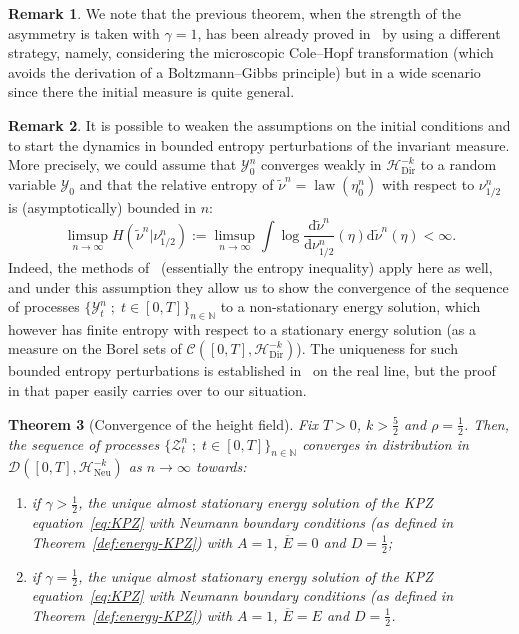 \documentclass[10pt]{amsart}
\newtheorem{theo}{Theorem}[section]
\theoremstyle{definition}\newtheorem{defi}[theo]{Definition}\newtheorem{rema}[theo]{Remark}\newtheorem{exam}[theo]{Example}\newtheorem{exem}[theo]{Example}\newtheorem{nota}[theo]{Notation}
\DeclareMathOperator{\law}{law}
\newcommand{\bb}[1]{{\mathbb #1}}
\newcommand{\mc}[1]{{\mathcal #1}}
\renewcommand{\mc}[1]{{\mathcal #1}}
\renewcommand{\bar}{\overline}
\renewcommand{\tilde}{\widetilde}
\newcommand*{\dd}{\mathrm{d}}
\begin{document}
\begin{rema}
We note that the previous theorem, when the strength of the asymmetry is taken with $\gamma =1$, has been already proved in~\cite{GLM} by using a different strategy, namely, considering the microscopic Cole--Hopf transformation (which avoids the derivation of a Boltzmann--Gibbs principle) but in a wide scenario since there the initial measure is quite general.
\end{rema}

\begin{rema}\label{rmk:stationary}
It is possible to weaken the assumptions on the initial conditions and to start the dynamics in bounded entropy perturbations of the invariant measure. More precisely, we could assume that $\mc Y^n_0$ converges weakly in $\mc H_{\mathrm{Dir}}^{-k}$ to a random variable $\mc Y_0$ and that the relative entropy of $\tilde \nu^n = \law(\mc \eta^n_0)$ with respect to $\nu^n_{1/2}$ is (asymptotically) bounded in $n$:
\[
\limsup_{n\to\infty} H(\tilde \nu^n | \nu^n_{1/2}) := \limsup_{n\to\infty} \int \log \frac{\dd \tilde \nu^n}{\dd \nu^n_{1/2}}(\eta) \dd\tilde \nu^n(\eta) < \infty.
\]
Indeed, the methods of~\cite{GJS} (essentially the entropy inequality) apply here as well, and under this assumption they allow us to show the convergence of the sequence of processes $\{\mc Y^n_t \; ; \; t \in [0,T]\}_{n\in\bb N}$ to a non-stationary energy solution, which however has finite entropy with respect to a stationary energy solution (as a measure on the Borel sets of $\mc C([0,T], \mc H_{\mathrm{Dir}}^{-k})$). The uniqueness for such bounded entropy perturbations is established in~\cite{Gubinelli2017} on the real line, but the proof in that paper easily carries over to our situation.
\end{rema}


\begin{theo}[Convergence of the height field] \label{theo:convheight}
Fix $T>0$, $k>\frac52$ and $\rho=\frac12$.
%
Then, the sequence of processes $\{\mc Z^n_t\; ;\; t \in [0,T]\}_{n\in{\bb N}}$ converges in distribution in $\mc D([0,T], \mc H_{\mathrm{Neu}}^{-k})$ as $n\to\infty$ towards:
\begin{enumerate}
\item \label{3.20.1} if $\gamma > \frac12$, the unique almost stationary energy solution of the KPZ equation~\eqref{eq:KPZ} with Neumann boundary conditions (as defined in Theorem~\ref{def:energy-KPZ}) with $A=1$, $\bar E=0$ and $D=\frac12$;
\item \label{3.20.2} if $\gamma=\frac12$, the unique almost stationary energy solution of the KPZ equation~\eqref{eq:KPZ} with Neumann boundary conditions (as defined in Theorem~\ref{def:energy-KPZ}) with $A=1$, $\bar E = E$ and $D=\frac12$.
\end{enumerate}
\end{theo}
\end{document}
